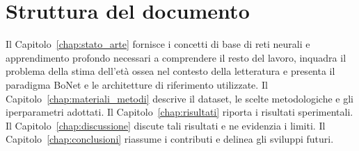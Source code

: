 \section*{Struttura del documento}

Il Capitolo~\ref{chap:stato_arte} fornisce i concetti di base di reti
neurali e apprendimento profondo necessari a comprendere il resto del
lavoro, inquadra il problema della stima dell'età ossea nel contesto
della letteratura e presenta il paradigma BoNet e le architetture di
riferimento utilizzate. Il Capitolo~\ref{chap:materiali_metodi} descrive
il dataset, le scelte metodologiche e gli iperparametri adottati. Il
Capitolo~\ref{chap:risultati} riporta i risultati sperimentali. Il
Capitolo~\ref{chap:discussione} discute tali risultati e ne evidenzia i
limiti. Il Capitolo~\ref{chap:conclusioni} riassume i contributi e
delinea gli sviluppi futuri.

\newpage
$ $
